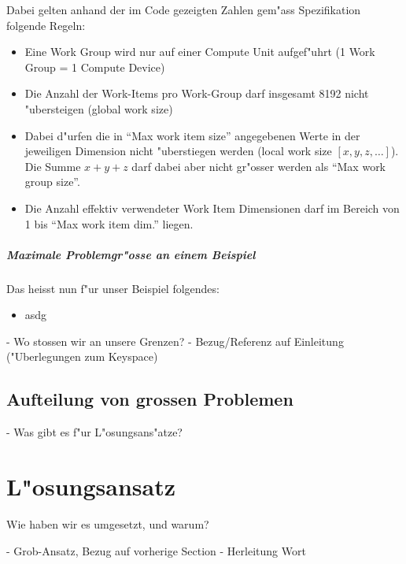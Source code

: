 \begin{refsection}
\begin{description}
\end{description}


\noindent Dabei gelten anhand der im Code gezeigten Zahlen gem"ass
Spezifikation\cite{crypto:opencl_ref} folgende Regeln:

\begin{itemize}
 \item Eine Work Group wird nur auf einer Compute Unit aufgef"uhrt (1 Work Group = 1 
       Compute Device) 
 \item Die Anzahl der Work-Items pro Work-Group darf insgesamt 8192 nicht "ubersteigen (global work size)
 \item Dabei d"urfen die in ``Max work item size'' angegebenen Werte in der jeweiligen 
       Dimension nicht "uberstiegen werden (local work size $[x,y,z,\ldots]$).
			 Die Summe $x + y + z$ darf dabei aber nicht gr"osser werden als ``Max work group size''.
 \item Die Anzahl effektiv verwendeter Work Item Dimensionen darf im Bereich von 1 bis
       ``Max work item dim.'' liegen.
\end{itemize}


\subparagraph{Maximale Problemgr"osse an einem Beispiel}

Das heisst nun f"ur unser Beispiel folgendes:

\begin{itemize}
 \item asdg
\end{itemize}








- Wo stossen wir an unsere Grenzen?
- Bezug/Referenz auf Einleitung ("Uberlegungen zum Keyspace)

\subsection{Aufteilung von grossen Problemen}

- Was gibt es f"ur L"osungsans"atze?




\section{L"osungsansatz}

Wie haben wir es umgesetzt, und warum?

- Grob-Ansatz, Bezug auf vorherige Section
- Herleitung Wort


\end{refsection}
